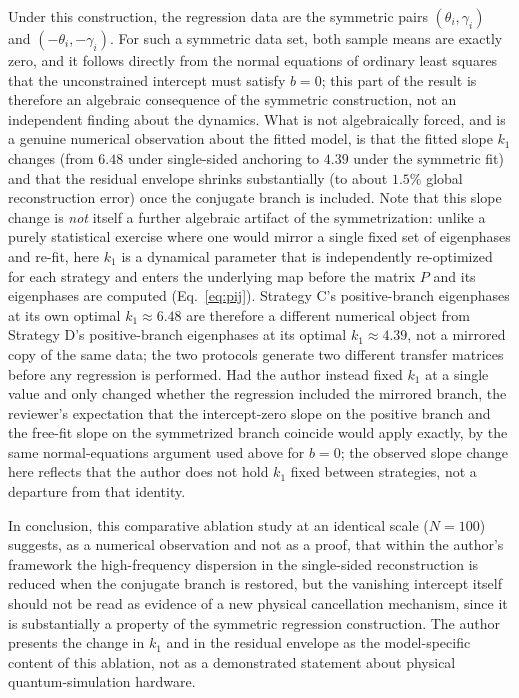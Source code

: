 \documentclass[mca,article,submit,oneauthor,pdftex]{Definitions/mdpi}
\begin{document}
Under this construction, the regression data are the symmetric pairs
\((\theta_i,\gamma_i)\) and \((-\theta_i,-\gamma_i)\). For such a symmetric
data set, both sample means are exactly zero, and it follows directly from
the normal equations of ordinary least squares that the unconstrained
intercept must satisfy \(b=0\); this part of the result is therefore an
algebraic consequence of the symmetric construction, not an independent
finding about the dynamics. What is not algebraically forced, and is a
genuine numerical observation about the fitted model, is that the fitted
slope \(k_1\) changes (from \(\text{6.48}\) under single-sided anchoring to
\(\text{4.39}\) under the symmetric fit) and that the residual envelope
shrinks substantially (to about \(\text{1.5\%}\) global reconstruction
error) once the conjugate branch is included. Note that this slope
change is \emph{not} itself a further algebraic artifact of the
symmetrization: unlike a purely statistical exercise where one would
mirror a single fixed set of eigenphases and re-fit, here $k_1$ is a
dynamical parameter that is independently re-optimized for each strategy
and enters the underlying map before the matrix $P$ and its eigenphases
are computed (Eq.~\eqref{eq:pij}). Strategy C's positive-branch eigenphases
at its own optimal $k_1\approx6.48$ are therefore a different numerical
object from Strategy D's positive-branch eigenphases at its optimal
$k_1\approx4.39$, not a mirrored copy of the same data; the two protocols
generate two different transfer matrices before any regression is
performed. Had the author instead fixed $k_1$ at a single value and only changed
whether the regression included the mirrored branch, the reviewer's
expectation that the intercept-zero slope on the positive branch and the
free-fit slope on the symmetrized branch coincide would apply exactly, by
the same normal-equations argument used above for $b=0$; the observed
slope change here reflects that the author does not hold $k_1$ fixed between
strategies, not a departure from that identity.

In conclusion, this comparative ablation study at an identical scale
(\({N}=100\)) suggests, as a numerical observation and not as a proof, that
within the author's framework the high-frequency dispersion in the single-sided
reconstruction is reduced when the conjugate branch is restored, but the
vanishing intercept itself should not be read as evidence of a new
physical cancellation mechanism, since it is substantially a property of
the symmetric regression construction. The author presents the change in $k_1$ and
in the residual envelope as the model-specific content of this ablation,
not as a demonstrated statement about physical quantum-simulation
hardware.
\end{document}
